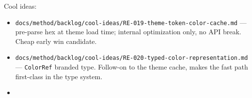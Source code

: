 Cool ideas:

\begin{itemize}
\tightlist
\item
  \texttt{d\allowbreak{}o\allowbreak{}c\allowbreak{}s\allowbreak{}/\allowbreak{}m\allowbreak{}e\allowbreak{}t\allowbreak{}h\allowbreak{}o\allowbreak{}d\allowbreak{}/\allowbreak{}b\allowbreak{}a\allowbreak{}c\allowbreak{}k\allowbreak{}l\allowbreak{}o\allowbreak{}g\allowbreak{}/\allowbreak{}c\allowbreak{}o\allowbreak{}o\allowbreak{}l\allowbreak{}-\allowbreak{}i\allowbreak{}d\allowbreak{}e\allowbreak{}a\allowbreak{}s\allowbreak{}/\allowbreak{}R\allowbreak{}E\allowbreak{}-\allowbreak{}0\allowbreak{}1\allowbreak{}9\allowbreak{}-\allowbreak{}t\allowbreak{}h\allowbreak{}e\allowbreak{}m\allowbreak{}e\allowbreak{}-\allowbreak{}t\allowbreak{}o\allowbreak{}k\allowbreak{}e\allowbreak{}n\allowbreak{}-\allowbreak{}c\allowbreak{}o\allowbreak{}l\allowbreak{}o\allowbreak{}r\allowbreak{}-\allowbreak{}c\allowbreak{}a\allowbreak{}c\allowbreak{}h\allowbreak{}e\allowbreak{}.\allowbreak{}m\allowbreak{}d} --- pre-parse hex at theme load time; internal optimization only, no API break. Cheap early win candidate.
\item
  \texttt{d\allowbreak{}o\allowbreak{}c\allowbreak{}s\allowbreak{}/\allowbreak{}m\allowbreak{}e\allowbreak{}t\allowbreak{}h\allowbreak{}o\allowbreak{}d\allowbreak{}/\allowbreak{}b\allowbreak{}a\allowbreak{}c\allowbreak{}k\allowbreak{}l\allowbreak{}o\allowbreak{}g\allowbreak{}/\allowbreak{}c\allowbreak{}o\allowbreak{}o\allowbreak{}l\allowbreak{}-\allowbreak{}i\allowbreak{}d\allowbreak{}e\allowbreak{}a\allowbreak{}s\allowbreak{}/\allowbreak{}R\allowbreak{}E\allowbreak{}-\allowbreak{}0\allowbreak{}2\allowbreak{}0\allowbreak{}-\allowbreak{}t\allowbreak{}y\allowbreak{}p\allowbreak{}e\allowbreak{}d\allowbreak{}-\allowbreak{}c\allowbreak{}o\allowbreak{}l\allowbreak{}o\allowbreak{}r\allowbreak{}-\allowbreak{}r\allowbreak{}e\allowbreak{}p\allowbreak{}r\allowbreak{}e\allowbreak{}s\allowbreak{}e\allowbreak{}n\allowbreak{}t\allowbreak{}a\allowbreak{}t\allowbreak{}i\allowbreak{}o\allowbreak{}n\allowbreak{}.\allowbreak{}m\allowbreak{}d} --- \texttt{C\allowbreak{}o\allowbreak{}l\allowbreak{}o\allowbreak{}r\allowbreak{}R\allowbreak{}e\allowbreak{}f} branded type. Follow-on to the theme cache, makes the fast path first-class in the type system.
\item

\end{itemize}
